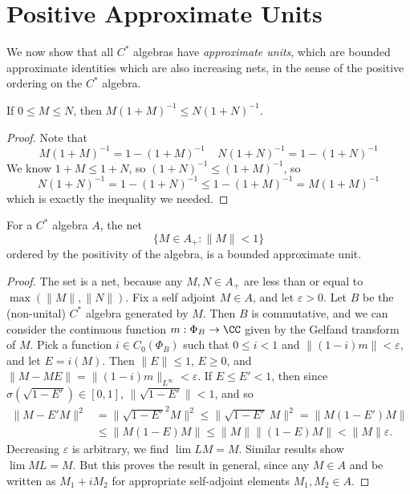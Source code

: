 \section{Positive Approximate Units}

We now show that all $C^*$ algebras have \emph{approximate units}, which are bounded approximate identities which are also increasing nets, in the sense of the positive ordering on the $C^*$ algebra.

\begin{lemma}
    If $0 \leq M \leq N$, then $M(1 + M)^{-1} \leq N(1 + N)^{-1}$.
\end{lemma}
\begin{proof}
    Note that
    \[ M(1 + M)^{-1} = 1 - (1 + M)^{-1}\ \ \ \ \ N(1 + N)^{-1} = 1 - (1 + N)^{-1} \]
    We know $1 + M \leq 1 + N$, so $(1 + N)^{-1} \leq (1 + M)^{-1}$, so
    \[ N(1 + N)^{-1} = 1-(1 + N)^{-1} \leq 1-(1 + M)^{-1} = M(1 + M)^{-1} \]
    which is exactly the inequality we needed.
\end{proof}

\begin{prop}
    For a $C^*$ algebra $A$, the net
    \[ \{ M \in A_+ : \| M \| < 1 \} \]
    ordered by the positivity of the algebra, is a bounded approximate unit.
\end{prop}
\begin{proof}
    The set is a net, because any $M,N \in A_+$ are less than or equal to $\max(\|M\|,\|N\|)$. Fix a self adjoint $M \in A$, and let $\varepsilon > 0$. Let $B$ be the (non-unital) $C^*$ algebra generated by $M$. Then $B$ is commutative, and we can consider the continuous function $m: \Phi_B \to \CC$ given by the Gelfand transform of $M$. Pick a function $i \in C_0(\Phi_B)$ such that $0 \leq i < 1$ and $\| (1 - i) m \| < \varepsilon$, and let $E = i(M)$. Then $\| E \| \leq 1$, $E \geq 0$, and $\| M - ME \| = \| (1 - i) m \|_{L^\infty} < \varepsilon$. If $E \leq E' < 1$, then since $\sigma(\sqrt{1 - E'}) \in [0,1]$, $\| \sqrt{1 - E'} \| < 1$, and so
    \begin{align*}
        \| M - E'M \|^2 &= \| \sqrt{1 - E'}^2 M \|^2 \leq \| \sqrt{1 - E'}\ M \|^2 = \| M(1 - E')M \|\\
        &\leq \| M(1 - E)M \| \leq \| M \| \| (1 - E)M \| < \| M \| \varepsilon.
    \end{align*}
    Decreasing $\varepsilon$ is arbitrary, we find $\lim LM = M$. Similar results show $\lim ML = M$. But this proves the result in general, since any $M \in A$ and be written as $M_1 + i M_2$ for appropriate self-adjoint elements $M_1,M_2 \in A$.
\end{proof}

